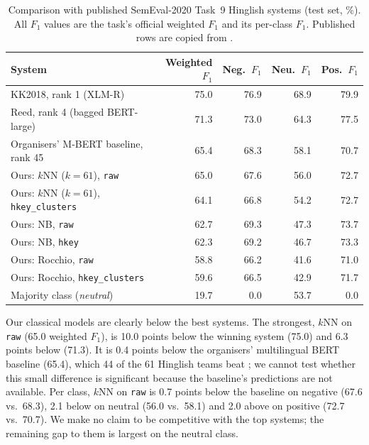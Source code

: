 \begin{table}[t]
\centering
\small
\caption{Comparison with published SemEval-2020 Task~9 Hinglish systems (test set, \%). All
$F_1$ values are the task's official weighted $F_1$ and its per-class $F_1$. Published rows are
copied from \citet[Table~3]{patwa2020semeval}.}
\label{tab:e2-compare}
\begin{tabular}{lrrrr}
\toprule
System & Weighted $F_1$ & Neg.\ $F_1$ & Neu.\ $F_1$ & Pos.\ $F_1$ \\
\midrule
KK2018, rank 1 (XLM-R) \citep{patwa2020semeval}                         & 75.0 & 76.9 & 68.9 & 79.9 \\
Reed, rank 4 (bagged BERT-large) \citep{gopalan2020reed}                & 71.3 & 73.0 & 64.3 & 77.5 \\
Organisers' M-BERT baseline, rank 45 \citep{patwa2020semeval}           & 65.4 & 68.3 & 58.1 & 70.7 \\
\midrule
Ours: $k$NN ($k=61$), \texttt{raw}                                      & 65.0 & 67.6 & 56.0 & 72.7 \\
Ours: $k$NN ($k=61$), \texttt{hkey\_clusters}                           & 64.1 & 66.8 & 54.2 & 72.7 \\
Ours: NB, \texttt{raw}                                                  & 62.7 & 69.3 & 47.3 & 73.7 \\
Ours: NB, \texttt{hkey}                                                 & 62.3 & 69.2 & 46.7 & 73.3 \\
Ours: Rocchio, \texttt{raw}                                             & 58.8 & 66.2 & 41.6 & 71.0 \\
Ours: Rocchio, \texttt{hkey\_clusters}                                  & 59.6 & 66.5 & 42.9 & 71.7 \\
Majority class (\emph{neutral})                                         & 19.7 &  0.0 & 53.7 &  0.0 \\
\bottomrule
\end{tabular}
\end{table}

Our classical models are clearly below the best systems. The strongest, $k$NN on \texttt{raw}
(65.0 weighted $F_1$), is 10.0 points below the winning system (75.0) and 6.3 points below
\citet{gopalan2020reed} (71.3). It is 0.4 points below the organisers' multilingual BERT baseline
(65.4), which 44 of the 61 Hinglish teams beat \citep{patwa2020semeval}; we cannot test whether
this small difference is significant because the baseline's predictions are not available. Per
class, $k$NN on \texttt{raw} is 0.7 points below the baseline on negative (67.6 vs.\ 68.3), 2.1
below on neutral (56.0 vs.\ 58.1) and 2.0 above on positive (72.7 vs.\ 70.7). We make no claim to
be competitive with the top systems; the remaining gap to them is largest on the neutral class.

